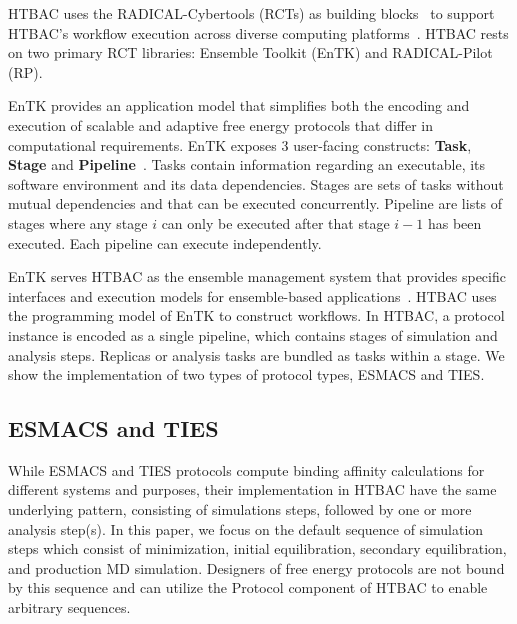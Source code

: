 
HTBAC uses the RADICAL-Cybertools (RCTs) as building
blocks~\cite{review_bb_2016} to support HTBAC's workflow execution across
diverse computing platforms~\cite{turilli2017comprehensive}. HTBAC rests on
two primary RCT libraries: Ensemble Toolkit (EnTK) and RADICAL-Pilot (RP).

EnTK provides an application model that simplifies both the encoding and
execution of scalable and adaptive free energy protocols that differ in
computational requirements. EnTK exposes 3 user-facing constructs:
\textbf{Task}, \textbf{Stage} and \textbf{Pipeline}~\cite{power-of-many17}.
Tasks contain information regarding an executable, its software environment
and its data dependencies. Stages are sets of tasks without mutual
dependencies and that can be executed concurrently. Pipeline are lists of
stages where any stage $i$ can only be executed after that stage $i - 1$ has
been executed. Each pipeline can execute independently.

EnTK serves HTBAC as the ensemble management system that provides specific
interfaces and execution models for ensemble-based
applications~\cite{power-of-many17}. HTBAC uses the programming model of EnTK
to construct workflows. In HTBAC, a protocol instance is encoded as a single
pipeline, which contains stages of simulation and analysis steps. Replicas or
analysis tasks are bundled as tasks within a stage. We show the
implementation of two types of protocol types, ESMACS and TIES.


\subsection{ESMACS and TIES}


While ESMACS and TIES protocols compute binding affinity calculations for
different systems and purposes, their implementation in HTBAC have the same
underlying pattern, consisting of simulations steps, followed by one or more
analysis step(s). In this paper, we focus on the default sequence of
simulation steps which consist of minimization, initial equilibration,
secondary equilibration, and production MD simulation. Designers of free
energy protocols are not bound by this sequence and can utilize the Protocol
component of HTBAC to enable arbitrary sequences. 

